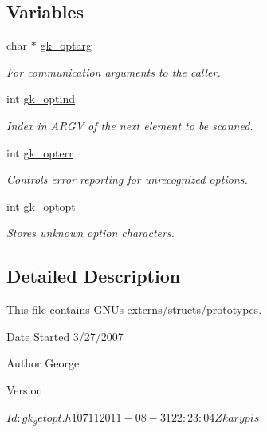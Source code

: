 \subsection*{Variables}
\begin{DoxyCompactItemize}
\item 
char $\ast$ \hyperlink{a00050_a7e251e946564d7de41aa8f602b94e74e}{gk\+\_\+optarg}
\begin{DoxyCompactList}\small\item\em For communication arguments to the caller. \end{DoxyCompactList}\item 
int \hyperlink{a00050_ab70fc0e7e22192b687bd0d377bf61e32}{gk\+\_\+optind}
\begin{DoxyCompactList}\small\item\em Index in A\+R\+GV of the next element to be scanned. \end{DoxyCompactList}\item 
int \hyperlink{a00050_abf798c082a4ebebbd9482c931c109541}{gk\+\_\+opterr}
\begin{DoxyCompactList}\small\item\em Controls error reporting for unrecognized options. \end{DoxyCompactList}\item 
int \hyperlink{a00050_ac77d8583b792a19e5afae69bb702a23a}{gk\+\_\+optopt}
\begin{DoxyCompactList}\small\item\em Stores unknown option characters. \end{DoxyCompactList}\end{DoxyCompactItemize}


\subsection{Detailed Description}
This file contains G\+NU\textquotesingle{}s externs/structs/prototypes. 

\begin{DoxyDate}{Date}
Started 3/27/2007 
\end{DoxyDate}
\begin{DoxyAuthor}{Author}
George 
\end{DoxyAuthor}
\begin{DoxyVersion}{Version}
\begin{DoxyVerb}$Id: gk_getopt.h 10711 2011-08-31 22:23:04Z karypis $ \end{DoxyVerb}
 
\end{DoxyVersion}



